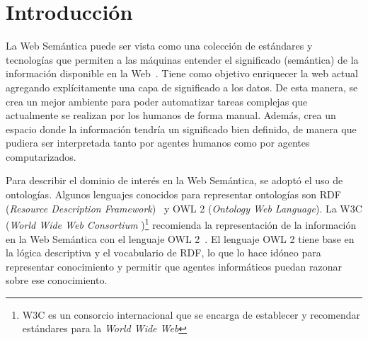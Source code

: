 \documentclass[11pt,a4paper,spanish]{book}
\begin{document}
	

\frontmatter





%

%






\tableofcontents{}

\listoffigures


\newpage

\mainmatter



\chapter{Introducción}
La Web Semántica puede ser vista como una colección de estándares y tecnologías que permiten a las máquinas entender el significado (semántica) de la información disponible en la Web~\cite{yu2011developer}. Tiene como objetivo enriquecer la web actual agregando explícitamente una capa de significado a los datos. De esta manera, se crea un mejor ambiente para poder automatizar tareas complejas que actualmente se realizan por los humanos de forma manual. Además, crea un espacio donde la información tendría un significado bien definido, de manera que pudiera ser interpretada tanto por agentes humanos como por agentes computarizados.

Para describir el dominio de interés en la Web Semántica, se adoptó el uso de ontologías. Algunos lenguajes conocidos para representar ontologías son RDF (\emph{Resource Description Framework})~\cite{RDFRecomendW3C} y OWL 2 (\emph{Ontology Web Language}). La W3C (\emph{World Wide Web Consortium })\footnote{W3C es un consorcio internacional que se encarga de establecer y recomendar estándares para la \emph{World Wide Web}} recomienda la representación de la información en la Web Semántica con el lenguaje OWL 2~\cite{RecomendW3C}. El lenguaje OWL 2 tiene base en la lógica descriptiva y el vocabulario de RDF, lo que lo hace idóneo para representar conocimiento y permitir que agentes informáticos puedan razonar sobre ese conocimiento.
\end{document}
